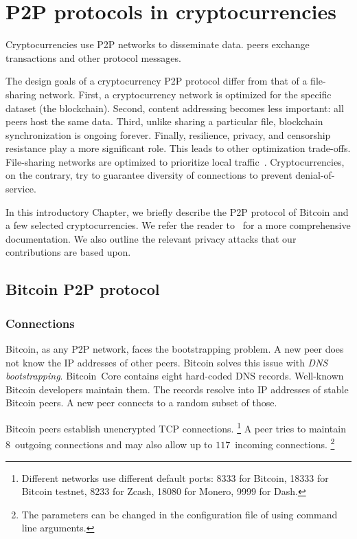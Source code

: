 \chapter{P2P protocols in cryptocurrencies}

\label{Chapter02IntroP2P}

Cryptocurrencies use P2P networks to disseminate data.
peers exchange transactions and other protocol messages.

The design goals of a cryptocurrency P2P protocol differ from that of a file-sharing network.
First, a cryptocurrency network is optimized for the specific dataset (the blockchain).
Second, content addressing becomes less important: all peers host the same data.
Third, unlike sharing a particular file, blockchain synchronization is ongoing forever.
Finally, resilience, privacy, and censorship resistance play a more significant role.
This leads to other optimization trade-offs.
File-sharing networks are optimized to prioritize local traffic~\cite{Yoshida2012,Wang2012}.
Cryptocurrencies, on the contrary, try to guarantee diversity of connections to prevent denial-of-service.

In this introductory Chapter, we briefly describe the P2P protocol of Bitcoin and a few selected cryptocurrencies.
We refer the reader to~\cite{BitcoinWiki, Garay2015} for a more comprehensive documentation.
We also outline the relevant privacy attacks that our contributions are based upon.


\section{Bitcoin P2P protocol}

\subsection{Connections}

Bitcoin, as any P2P network, faces the bootstrapping problem.
A new peer does not know the IP addresses of other peers.
Bitcoin solves this issue with \textit{DNS bootstrapping}.
Bitcoin~Core contains eight hard-coded DNS records.
Well-known Bitcoin developers maintain them.
The records resolve into IP addresses of stable Bitcoin peers.
A new peer connects to a random subset of those.

Bitcoin peers establish unencrypted TCP connections.
\footnote{Different networks use different default ports: 8333 for Bitcoin, 18333 for Bitcoin testnet, 8233 for Zcash, 18080 for Monero, 9999 for Dash.}
A peer tries to maintain $8$~outgoing connections and may also allow up to $117$~incoming connections.
\footnote{The parameters can be changed in the configuration file of using command line arguments.}


